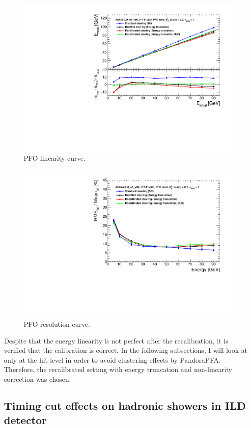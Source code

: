 \begin{figure}[htbp!]
  \centering
  \includegraphics[width=0.7\linewidth]{../Thesis_Plots/ILD/NoSmearing/Plots_Comparison/Comparison_linearity_Curves_PFO}
  \caption{PFO linearity curve.} \label{fig:linpfo}
\end{figure}

\begin{figure}[htbp!]
  \centering
  \includegraphics[width=0.7\linewidth]{../Thesis_Plots/ILD/NoSmearing/Plots_Comparison/Comparison_resolution_Curves_PFO}
  \caption{PFO resolution curve.} \label{fig:resopfo}
\end{figure}

Despite that the energy linearity is not perfect after the recalibration, it is verified that the calibration is correct. In the following subsections, I will look at only at the hit level in order to avoid clustering effects by PandoraPFA. Therefore, the recalibrated setting with energy truncation and non-linearity correction was chosen.

\subsection{Timing cut effects on hadronic showers in ILD detector}
\label{sec:MCLevelILDTiming}

